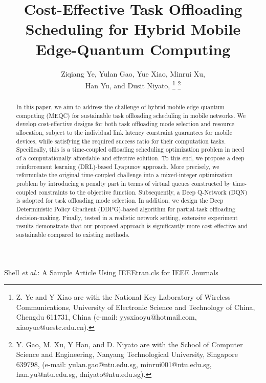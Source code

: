 \documentclass[journal]{IEEEtran}
\begin{document}
\title{Cost-Effective Task Offloading Scheduling for Hybrid Mobile Edge-Quantum Computing}

\author{Ziqiang Ye,\IEEEmembership{~}
Yulan Gao, 
Yue Xiao, 
Minrui Xu, \\
Han Yu, 
and Dusit Niyato, 
\thanks{Z. Ye and Y Xiao are with the National Key Laboratory of Wireless Communications, University of Electronic Science and Technology of China, Chengdu 611731, China (e-mail: yysxiaoyu@hotmail.com, xiaoyue@uestc.edu.cn).}
\thanks{Y. Gao, M. Xu, Y Han, and D. Niyato are with the School of Computer Science and Engineering, Nanyang Technological University, Singapore 639798, (e-mail: yulan.gao@ntu.edu.sg, minrui001@ntu.edu.sg, han.yu@ntu.edu.sg, dniyato@ntu.edu.sg).}}


\markboth{~~~}
{Shell \MakeLowercase{\textit{et al.}}: A Sample Article Using IEEEtran.cls for IEEE Journals}

\maketitle

\begin{abstract}
In this paper, we aim to address the challenge of hybrid mobile edge-quantum computing (MEQC) for sustainable task offloading scheduling in  mobile networks.
We develop cost-effective designs for both task offloading mode selection and resource allocation, subject to the individual link latency constraint guarantees for mobile devices, while satisfying the required success ratio for their computation tasks.
Specifically, this is a time-coupled offloading scheduling optimization problem in need of a computationally affordable and effective solution.
To this end, we propose a deep reinforcement learning (DRL)-based Lyapunov approach.
More precisely, we reformulate the original time-coupled challenge into a mixed-integer optimization problem by introducing a penalty part in terms of virtual queues constructed by time-coupled constraints to the objective function.
Subsequently, a Deep Q-Network (DQN) is adopted for task offloading mode selection.
In addition, we design the Deep Deterministic Policy Gradient (DDPG)-based algorithm for partial-task offloading decision-making.
Finally, tested in a realistic network setting,
extensive experiment results demonstrate that our proposed approach is significantly more cost-effective and sustainable compared to existing methods.
\end{abstract}
\end{document}
